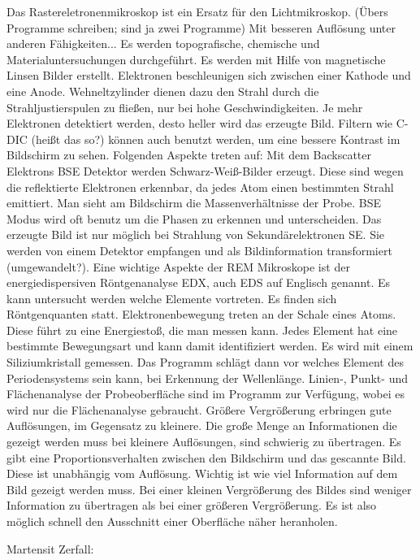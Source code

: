 Das Rastereletronenmikroskop ist ein Ersatz für den Lichtmikroskop. (Übers Programme schreiben; sind ja zwei Programme) Mit besseren Auflösung unter anderen Fähigkeiten... Es werden topografische, chemische und Materialuntersuchungen durchgeführt. Es werden mit Hilfe von magnetische Linsen Bilder erstellt. Elektronen beschleunigen sich zwischen einer Kathode und eine Anode. Wehneltzylinder dienen dazu den Strahl durch die Strahljustierspulen zu fließen, nur bei hohe Geschwindigkeiten. Je mehr Elektronen detektiert werden, desto heller wird das erzeugte Bild. Filtern wie C-DIC (heißt das so?) können auch benutzt werden, um eine bessere Kontrast im Bildschirm zu sehen.
Folgenden Aspekte treten auf:
Mit dem Backscatter Elektrons BSE Detektor werden Schwarz-Weiß-Bilder erzeugt. Diese sind wegen die reflektierte Elektronen erkennbar, da jedes Atom einen bestimmten Strahl emittiert. Man sieht am Bildschirm die Massenverhältnisse der Probe. BSE Modus wird oft benutz um die Phasen zu erkennen und unterscheiden.
Das erzeugte Bild ist nur möglich bei Strahlung von Sekundärelektronen SE. Sie werden von einem Detektor empfangen und als Bildinformation transformiert (umgewandelt?). 
Eine wichtige Aspekte der REM Mikroskope ist der energiedispersiven Röntgenanalyse EDX, auch EDS auf Englisch genannt. Es kann untersucht werden welche Elemente vortreten. Es finden sich Röntgenquanten statt. Elektronenbewegung treten an der Schale eines Atoms. Diese führt zu eine Energiestoß, die man messen kann. Jedes Element hat eine bestimmte Bewegungsart und kann damit identifiziert werden. Es wird mit einem Siliziumkristall gemessen. Das Programm schlägt dann vor welches Element des Periodensystems sein kann, bei Erkennung der Wellenlänge. 
Linien-, Punkt- und Flächenanalyse der Probeoberfläche sind im Programm zur Verfügung, wobei es wird nur die Flächenanalyse gebraucht. 
Größere Vergrößerung erbringen gute Auflösungen, im Gegensatz zu kleinere. Die große Menge an Informationen die gezeigt werden muss bei kleinere Auflösungen, sind schwierig zu übertragen. Es gibt eine Proportionsverhalten zwischen den Bildschirm und das gescannte Bild. Diese ist unabhängig vom Auflösung. Wichtig ist wie viel Information auf dem Bild gezeigt werden muss.  Bei einer kleinen Vergrößerung des Bildes sind weniger Information zu übertragen als bei einer größeren Vergrößerung. Es ist also möglich schnell den Ausschnitt einer Oberfläche näher heranholen.

Martensit Zerfall: 


